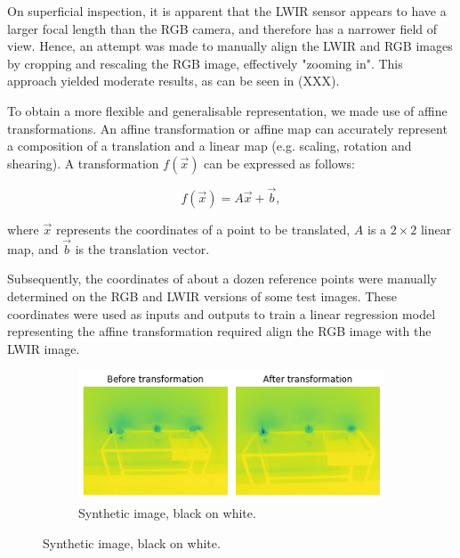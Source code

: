 \documentclass{l4proj}
\begin{document}
On superficial inspection, it is apparent that the LWIR sensor appears to have a larger focal length than the RGB camera, and therefore has a narrower field of view. Hence, an attempt was made to manually align the LWIR and RGB images by cropping and rescaling the RGB image, effectively "zooming in". This approach yielded moderate results, as can be seen in (XXX).

To obtain a more flexible and generalisable representation, we made use of affine transformations. An affine transformation or affine map can accurately represent a composition of a translation and a linear map (e.g. scaling, rotation and shearing). A transformation $f(\vec{x})$ can be expressed as follows:

\begin{equation}
  f(\vec{x}) = A \vec{x} + \vec{b},
\end{equation}

where $\vec{x}$ represents the coordinates of a point to be translated, $A$ is a $2 \times 2$ linear map, and $\vec{b}$ is the translation vector.

Subsequently, the coordinates of about a dozen reference points were manually determined on the RGB and LWIR versions of some test images. These coordinates were used as inputs and outputs to train a linear regression model representing the affine transformation required align the RGB image with the LWIR image. 



\begin{figure}[h]
  \centering
  \begin{subfigure}[h!]{0.9\textwidth}
    \includegraphics[width=\textwidth]{images/registration/linear_model_alignment.png}
    \caption{Synthetic image, black on white.}
    \label{fig:linear_trans_before_after}
  \end{subfigure}
\end{figure}
\end{document}

